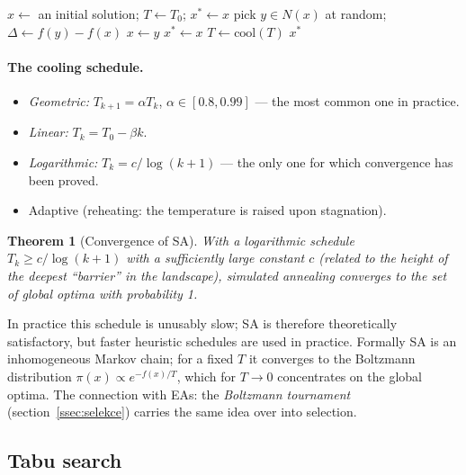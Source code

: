\documentclass[11pt,a4paper]{article}
\newtheorem{theorem}{Theorem}[section]
\theoremstyle{definition}
\providecommand{\uv}[1]{``#1''}
\begin{document}
\begin{algorithm}[!ht]
\caption{Simulated annealing}
\begin{algorithmic}[1]
\State $x \gets$ an initial solution; $T \gets T_0$; $x^* \gets x$
    \State pick $y \in N(x)$ at random; $\Delta \gets f(y) - f(x)$
     $x \gets y$ \EndIf
     $x^* \gets x$ \EndIf
  \EndFor
  \State $T \gets \mathrm{cool}(T)$
\EndWhile
\Ensure $x^*$
\end{algorithmic}
\end{algorithm}

\paragraph{The cooling schedule.}
\begin{itemize}
\item \emph{Geometric:} $T_{k+1} = \alpha T_k$, $\alpha \in [0.8, 0.99]$ ---
  the most common one in practice.
\item \emph{Linear:} $T_k = T_0 - \beta k$.
\item \emph{Logarithmic:} $T_k = c/\log(k+1)$ --- the only one for which
  convergence has been proved.
\item Adaptive (reheating: the temperature is raised upon stagnation).
\end{itemize}

\begin{theorem}[Convergence of SA]
With a logarithmic schedule $T_k \ge c/\log(k+1)$ with a sufficiently large
constant $c$ (related to the height of the deepest \uv{barrier} in the
landscape), simulated annealing converges to the set of global optima with
probability 1.
\end{theorem}
In practice this schedule is unusably slow; SA is therefore theoretically
satisfactory, but faster heuristic schedules are used in practice. Formally SA
is an inhomogeneous Markov chain; for a fixed $T$ it converges to the Boltzmann
distribution $\pi(x) \propto e^{-f(x)/T}$, which for $T \to 0$ concentrates on
the global optima. The connection with EAs: the \emph{Boltzmann tournament}
(section~\ref{ssec:selekce}) carries the same idea over into selection.

\subsection{Tabu search}
\end{document}
